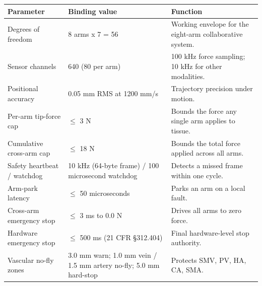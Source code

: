 \noindent\begin{tabularx}{\textwidth}{L{4.6cm} L{3.0cm} Y}
\toprule
\textbf{Parameter} & \textbf{Binding value} & \textbf{Function} \\
\midrule
Degrees of freedom & 8 arms x 7 = 56 & Working envelope for the eight-arm collaborative system. \\
\addlinespace
Sensor channels & 640 (80 per arm) & 100 kHz force sampling; 10 kHz for other modalities. \\
\addlinespace
Positional accuracy & 0.05 mm RMS at 1200 mm/s & Trajectory precision under motion. \\
\addlinespace
Per-arm tip-force cap & $\leq$ 3 N & Bounds the force any single arm applies to tissue. \\
\addlinespace
Cumulative cross-arm cap & $\leq$ 18 N & Bounds the total force applied across all arms. \\
\addlinespace
Safety heartbeat / watchdog & 10 kHz (64-byte frame) / 100 microsecond watchdog & Detects a missed frame within one cycle. \\
\addlinespace
Arm-park latency & $\leq$ 50 microseconds & Parks an arm on a local fault. \\
\addlinespace
Cross-arm emergency stop & $\leq$ 3 ms to 0.0 N & Drives all arms to zero force. \\
\addlinespace
Hardware emergency stop & $\leq$ 500 ms (21 CFR \S 312.404) & Final hardware-level stop authority. \\
\addlinespace
Vascular no-fly zones & 3.0 mm warn; 1.0 mm vein / 1.5 mm artery no-fly; 5.0 mm hard-stop & Protects SMV, PV, HA, CA, SMA. \\
\bottomrule
\end{tabularx}

